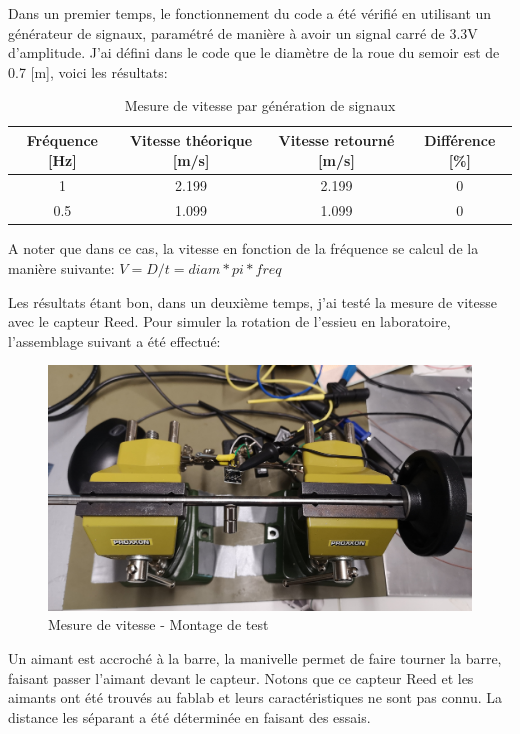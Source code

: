 Dans un premier temps, le fonctionnement du code a été vérifié en utilisant un générateur de signaux, paramétré de manière à avoir un signal carré de 3.3V d'amplitude.
J'ai défini dans le code que le diamètre de la roue du semoir est de 0.7 [m], voici les résultats:

\begin{table}[h]
    \begin{center}
        \caption{Mesure de vitesse par génération de signaux}
        \begin{tabular}{|c|c|c|c|}
            Fréquence [Hz] & Vitesse théorique [m/s] & Vitesse retourné [m/s] & Différence  [\%] \\ \hline
            1              & 2.199                   & 2.199                  & 0                \\
            0.5            & 1.099                   & 1.099                  & 0                \\
        \end{tabular}
    \end{center}

    A noter que dans ce cas, la vitesse en fonction de la fréquence se calcul de la manière suivante: \(V = D / t = diam*pi*freq\)
\end{table}

Les résultats étant bon, dans un deuxième temps, j'ai testé la mesure de vitesse avec le capteur Reed. Pour simuler la rotation de l'essieu en laboratoire,
l'assemblage suivant a été effectué:

\begin{figure}[H]
    \centering
    \includegraphics[width=12cm]{assets/figures/essieu.jpg}
    \caption{Mesure de vitesse - Montage de test}
\end{figure}
Un aimant est accroché à la barre, la manivelle permet de faire tourner la barre, faisant passer l'aimant devant le capteur.
Notons que ce capteur Reed et les aimants ont été trouvés au \gls{fablab} et leurs caractéristiques ne sont pas connu. La distance les
séparant a été déterminée en faisant des essais.

